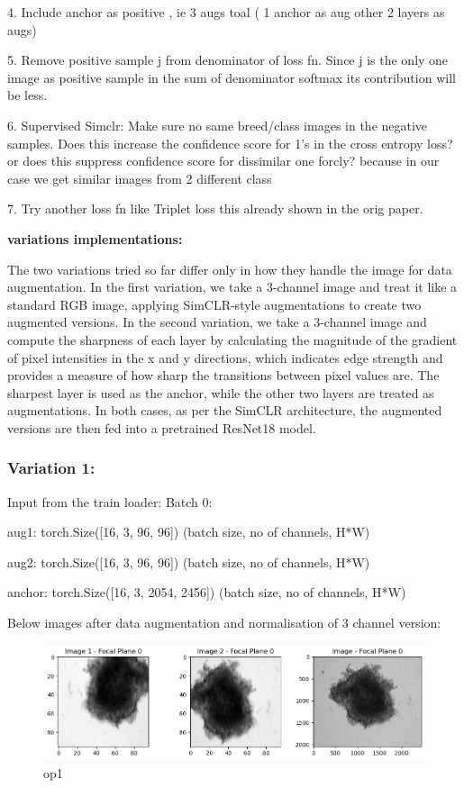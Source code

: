 \documentclass[12pt,twoside,a4paper,parskip]{scrbook} %
\begin{document}
4. Include anchor as positive , ie 3 augs  toal ( 1 anchor as aug other 2 layers as augs)

5. Remove positive sample j from denominator of loss fn. Since j is the  only one image as positive sample in the sum of denominator softmax its contribution will be less.

6. Supervised Simclr: Make sure no same breed/class images in the negative samples. Does this increase the confidence score for 1's in the cross entropy loss? or does this suppress confidence score for dissimilar one forcly? because in our case we get similar images from 2 different class 

7. Try another loss fn like Triplet loss this already shown in the orig paper.

\textbf{variations implementations:}

The two variations tried so far differ only in how they handle the image for data augmentation. In the first variation, we take a 3-channel image and treat it like a standard RGB image, applying SimCLR-style augmentations to create two augmented versions. In the second variation, we take a 3-channel image and compute the sharpness of each layer by calculating the magnitude of the gradient of pixel intensities in the x and y directions, which indicates edge strength and provides a measure of how sharp the transitions between pixel values are. The sharpest layer is used as the anchor, while the other two layers are treated as augmentations. In both cases, as per the SimCLR architecture, the augmented versions are then fed into a pretrained ResNet18 model.

\subsubsection{Variation 1:}
  Input from the train loader: 
  Batch 0:

  aug1: torch.Size([16, 3, 96, 96])        (batch size, no of channels, H*W)

  aug2: torch.Size([16, 3, 96, 96])                  (batch size, no of channels, H*W)

  anchor: torch.Size([16, 3, 2054, 2456])  (batch size, no of channels, H*W)

  Below images after data augmentation and normalisation of 3 channel version:

  \begin{figure}[H]
    \centering
    \includegraphics[width=0.9\linewidth]{figures/op1.png} %
    \caption{op1}
    \label{fig:output1}
  \end{figure}
\end{document}
